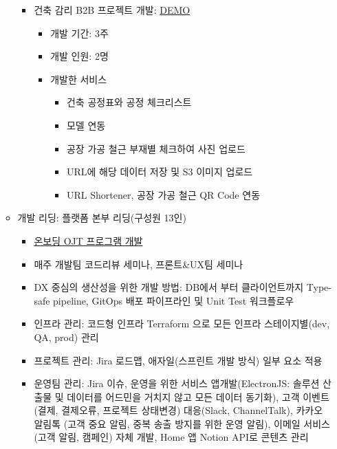 \begin{itemize}[label=]
\begin{itemize}[label=]
\begin{itemize}[label=]
\begin{itemize}[label=]
		            \end{itemize}
		      \item 건축 감리 B2B 프로젝트 개발: \href{https://asec.builderhub.io/dashboard/detail/initial/supervision}{DEMO} \hyperref[asec]{\space {}}
		            \begin{itemize}[label=]
			            \item 개발 기간: 3주
			            \item 개발 인원: 2명
			            \item 개발한 서비스
			                  \begin{itemize}
				                  \item 건축 공정표와 공정 체크리스트
				                  \item 모델 연동
				                  \item 공장 가공 철근 부재별 체크하여 사진 업로드
				                  \item URL에 해당 데이터 저장 및 S3 이미지 업로드
				                  \item URL Shortener, 공장 가공 철근 QR Code 연동
			                  \end{itemize}
		            \end{itemize}
	      \end{itemize}
	\item 개발 리딩: 플랫폼 본부 리딩(구성원 13인)
	      \begin{itemize}[label=]
		      \item \href{https://organization-pjk.gitbook.io/developer-ojt-program/}{온보딩 OJT 프로그램 개발}
		      \item 매주 개발팀 코드리뷰 세미나, 프론트\&UX팀 세미나
		      \item DX 중심의 생산성을 위한 개발 방법: DB에서 부터 클라이언트까지 Type-safe pipeline, GitOps 배포 파이프라인 및 Unit Test 워크플로우
		      \item 인프라 관리: 코드형 인프라 Terraform 으로 모든 인프라 스테이지별(dev, QA, prod) 관리
		      \item 프로젝트 관리: Jira 로드맵, 애자일(스프린트 개발 방식) 일부 요소 적용
		      \item 운영팀 관리: Jira 이슈, 운영을 위한 서비스 앱개발(ElectronJS: 솔루션 산출물 및 데이터를 어드민을 거치지 않고 모든 데이터 동기화), 고객 이벤트(결제, 결제오류, 프로젝트 상태변경) 대응(Slack, ChannelTalk), 카카오 알림톡 (고객 중요 알림, 중복
		            송출 방지를 위한 운영 알림), 이메일 서비스(고객 알림, 캠페인) 자체 개발, Home 앱 Notion API로 콘텐츠 관리

\end{itemize}
\end{itemize}
\end{itemize}
